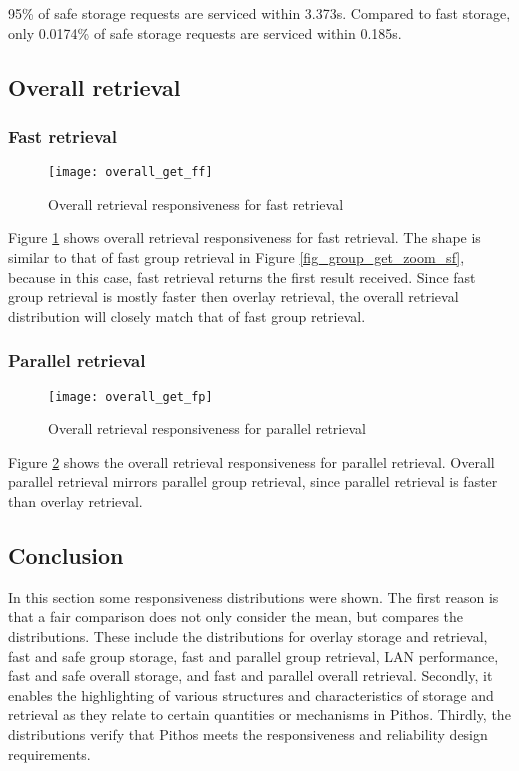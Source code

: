 95\% of safe storage requests are serviced within 3.373s. Compared to fast storage, only 0.0174\% of safe storage requests are serviced within 0.185s.

\subsection{Overall retrieval}
\subsubsection{Fast retrieval}
\begin{figure}[htbp]
 \centering
 \texttt{[image: overall\_get\_ff]}
 \caption{Overall retrieval responsiveness for fast retrieval}
 \label{fig_overall_get_ff}
\end{figure}
%
Figure \ref{fig_overall_get_ff} shows overall retrieval responsiveness for fast retrieval. The shape is similar to that of fast group retrieval in Figure \ref{fig_group_get_zoom_sf}, because in this case, fast retrieval returns the first result received. Since fast group retrieval is mostly faster then overlay retrieval, the overall retrieval distribution will closely match that of fast group retrieval.

\subsubsection{Parallel retrieval}
\begin{figure}[htbp]
 \centering
 \texttt{[image: overall\_get\_fp]}
 \caption{Overall retrieval responsiveness for parallel retrieval}
 \label{fig_overall_get_fp}
\end{figure}
%
Figure \ref{fig_overall_get_fp} shows the overall retrieval responsiveness for parallel retrieval. Overall parallel retrieval mirrors parallel group retrieval, since parallel retrieval is faster than overlay retrieval.

\subsection{Conclusion}

In this section some responsiveness distributions were shown. The first reason is that a fair comparison does not only consider the mean, but compares the distributions. These include the distributions for overlay storage and retrieval, fast and safe group storage, fast and parallel group retrieval, LAN performance, fast and safe overall storage, and fast and parallel overall retrieval. Secondly, it enables the highlighting of various structures and characteristics of storage and retrieval as they relate to certain quantities or mechanisms in Pithos. Thirdly, the distributions verify that Pithos meets the responsiveness and reliability design requirements.


